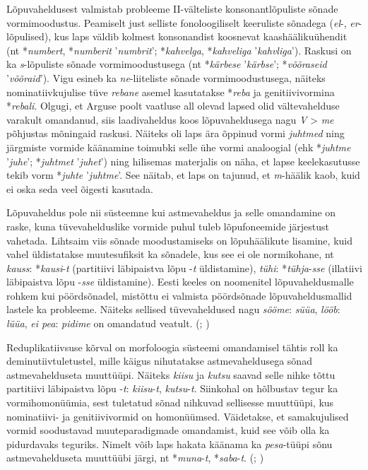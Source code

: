\documentclass[12pt]{article}
\begin{document}
Lõpuvaheldusest valmistab probleeme II-välteliste konsonantlõpuliste sõnade vormimoodustus. Peamiselt just selliste fonoloogiliselt keeruliste sõnadega (\emph{el}-, \emph{er}-lõpulised), kus laps väldib kolmest konsonandist koosnevat kaashäälikuühendit (nt *\emph{numbert}, *\emph{numberit} ’\emph{numbrit}’; *\emph{kahvelga}, *\emph{kahveliga} ’\emph{kahvliga}’). Raskusi on ka \emph{s}-lõpuliste sõnade vormimoodustusega (nt *\emph{kärbese} ’\emph{kärbse}’; *\emph{võõraseid} ’\emph{võõraid}’). Vigu esineb ka \emph{ne}-liiteliste sõnade vormimoodustusega, näiteks nominatiivkujulise tüve \emph{rebane} asemel kasutatakse *\emph{reba} ja genitiivivormina *\emph{rebali}. Olgugi, et Arguse poolt vaatluse all olevad lapsed olid vältevahelduse varakult omandanud, siis laadivaheldus koos lõpuvaheldusega nagu \emph{V} > \emph{me} põhjustas mõningaid raskusi. Näiteks oli laps ära õppinud vormi \emph{juhtmed} ning järgmiste vormide käänamine toimubki selle ühe vormi analoogial (ehk *\emph{juhtme} ’\emph{juhe}’; *\emph{juhtmet} ’\emph{juhet}’) ning hilisemas materjalis on näha, et lapse keelekasutusse tekib vorm *\emph{juhte} ’\emph{juhtme}’. See näitab, et laps on tajunud, et \emph{m}-häälik kaob, kuid ei oska seda veel õigesti kasutada. \citep[23--24]{ARGUSdiss}

Lõpuvaheldus pole nii süsteemne kui astmevaheldus ja selle omandamine on raske, kuna tüvevahelduslike vormide puhul tuleb lõpufoneemide järjestust vahetada. Lihtsaim viis sõnade moodustamiseks on lõpuhäälikute lisamine, kuid vahel üldistatakse muutesufiksit ka sõnadele, kus see ei ole normikohane, nt \emph{kauss}: *\emph{kausi}-\emph{t} (partitiivi läbipaistva lõpu -\emph{t} üldistamine), \emph{tühi}: *\emph{tühja}-\emph{sse} (illatiivi läbipaistva lõpu -\emph{sse} üldistamine). Eesti keeles on noomenitel lõpuvaheldusmalle rohkem kui pöördsõnadel, mistõttu ei valmista pöördsõnade lõpuvaheldusmallid lastele ka probleeme. Näiteks sellised tüvevaheldused nagu \emph{sööme}: \emph{süüa}, \emph{lööb}: \emph{lüüa}, \emph{ei pea}: \emph{pidime} on omandatud veatult. (\citealp[24, 26--27]{ARGUSdiss}; \citealp[20]{ARGUS_2})

Reduplikatiivsuse kõrval on morfoloogia süsteemi omandamisel tähtis roll ka deminutiivtuletustel, mille käigus nihutatakse astmevaheldusega sõnad astmevahelduseta muuttüüpi. Näiteks \emph{kiisu} ja \emph{kutsu} saavad selle nihke tõttu partitiivi läbipaistva lõpu -\emph{t}: \emph{kiisu}-\emph{t}, \emph{kutsu}-\emph{t}. Siinkohal on hõlbustav tegur ka vormihomonüümia, sest tuletatud sõnad nihkuvad sellisesse muuttüüpi, kus nominatiivi- ja genitiivivormid on homonüümsed. Väidetakse, et samakujulised vormid soodustavad muuteparadigmade omandamist, kuid see võib olla ka pidurdavaks teguriks. Nimelt võib laps hakata käänama ka \emph{pesa}-tüüpi sõnu astmevahelduseta muuttüübi järgi, nt *\emph{muna}-\emph{t}, *\emph{saba}-\emph{t}. (\citealp[25]{ARGUSdiss}; \citealp[19--20]{ARGUS_2})
\end{document}
